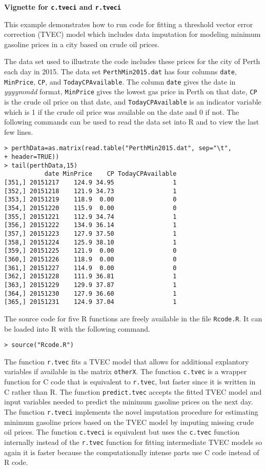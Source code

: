 \documentclass[12pt]{article}
\begin{document}
\begin{center}
{\Large\bf Vignette for {\tt c.tveci} and {\tt r.tveci}}
\end{center}

This example demonstrates how to run code for fitting a threshold vector error correction (TVEC) model which includes data imputation for modeling minimum gasoline prices in a city based on crude oil prices.  

The data set used to illustrate the code includes these prices for the city of Perth each day in 2015.  The data set {\tt PerthMin2015.dat} has four columns {\tt date}, {\tt MinPrice}, {\tt CP}, and {\tt TodayCPAvailable}.  The column {\tt date} gives the date in {\em yyyymmdd} format, {\tt MinPrice} gives the lowest gas price in Perth on that date, {\tt CP} is the crude oil price on that date, and {\tt TodayCPAvailable} is an indicator variable which is 1 if the crude oil price was available on the date and 0 if not.  The following commands can be used to read the data set into R and to view the last few lines.
\begin{verbatim}
> perthData=as.matrix(read.table("PerthMin2015.dat", sep="\t",
+ header=TRUE))
> tail(perthData,15)
           date MinPrice    CP TodayCPAvailable
[351,] 20151217    124.9 34.95                1
[352,] 20151218    121.9 34.73                1
[353,] 20151219    118.9  0.00                0
[354,] 20151220    115.9  0.00                0
[355,] 20151221    112.9 34.74                1
[356,] 20151222    134.9 36.14                1
[357,] 20151223    127.9 37.50                1
[358,] 20151224    125.9 38.10                1
[359,] 20151225    121.9  0.00                0
[360,] 20151226    118.9  0.00                0
[361,] 20151227    114.9  0.00                0
[362,] 20151228    111.9 36.81                1
[363,] 20151229    129.9 37.87                1
[364,] 20151230    127.9 36.60                1
[365,] 20151231    124.9 37.04                1
\end{verbatim}

The source code for five R functions are freely available in the file {\tt Rcode.R}.  It can be loaded into R with the following command.
\begin{verbatim}
> source("Rcode.R")
\end{verbatim}
The function {\tt r.tvec} fits a TVEC model that allows for additional explantory variables if available in the matrix {\tt otherX}.  The function {\tt c.tvec} is a wrapper function for C code that is equivalent to {\tt r.tvec}, but faster since it is written in C rather than R.  The function {\tt predict.tvec} accepts the fitted TVEC model and input variables needed to predict the minimum gasoline prices on the next day.
The function {\tt r.tveci} implements the novel imputation procedure for estimating minimum gasoline prices based on the TVEC model by imputing missing crude oil prices.  The function {\tt c.tveci} is equivalent but uses the {\tt c.tvec} function internally instead of the {\tt r.tvec} function for fitting intermediate TVEC models so again it is faster because the computationally intense parts use C code instead of R code.
\end{document}
